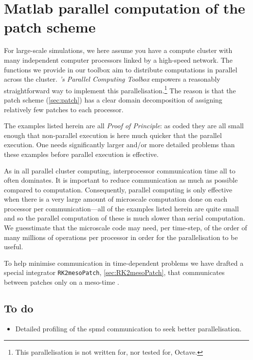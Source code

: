 \chapter{Matlab parallel computation of the patch scheme}
\label{sec:parallel}
\localtableofcontents


For large-scale simulations, we here assume you have a
compute cluster with many independent computer processors
linked by a high-speed network. The functions we provide in
our toolbox aim to distribute computations in parallel
across the cluster. \emph{\Matlab's Parallel Computing
Toolbox} empowers a reasonably straightforward way to
implement this parallelisation.\footnote{This
parallelisation is not written for, nor tested for, Octave.}
The reason is that the patch scheme (\cref{sec:patch}) has a
clear domain decomposition of assigning relatively few
patches to each processor.

The examples listed herein are all \emph{Proof of
Principle}: as coded they are all small enough that
non-parallel execution is here much quicker that the
parallel execution.  One needs significantly larger and/or
more detailed problems than these examples before parallel
execution is effective.  

As in all parallel cluster computing, interprocessor
communication time all to often dominates.  It is important
to reduce communication as much as possible compared to
computation.  Consequently, parallel computing is only
effective when there is a very large amount of microscale
computation done on each processor per communication---all
of the examples listed herein are quite small and so the
parallel computation of these is much slower than serial
computation.  We guesstimate that the microscale code may
need, per time-step, of the order of many millions of
operations per processor in order for the parallelisation to
be useful.

To help minimise communication in time-dependent problems we
have drafted a special integrator \verb|RK2mesoPatch|,
\cref{sec:RK2mesoPatch}, that communicates between patches
only on a meso-time \cite[]{Bunder2015a}.












\begin{devMan}

\section{To do}
\begin{itemize}
\item Detailed profiling of the spmd communication to seek better parallelisation.
\end{itemize}

\end{devMan}
